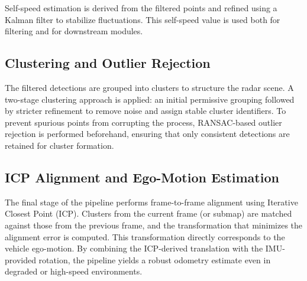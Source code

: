 Self-speed estimation is derived from the filtered points and refined using a Kalman filter to stabilize fluctuations. This self-speed value is used both for filtering and for downstream modules.

\subsection*{Clustering and Outlier Rejection}
The filtered detections are grouped into clusters to structure the radar scene. 
A two-stage clustering approach is applied: an initial permissive grouping followed by stricter refinement to remove noise and assign stable cluster identifiers.  
To prevent spurious points from corrupting the process, RANSAC-based outlier rejection is performed beforehand, ensuring that only consistent detections are retained for cluster formation.

\subsection*{ICP Alignment and Ego-Motion Estimation}
The final stage of the pipeline performs frame-to-frame alignment using Iterative Closest Point (ICP).  
Clusters from the current frame (or submap) are matched against those from the previous frame, and the transformation that minimizes the alignment error is computed.  
This transformation directly corresponds to the vehicle ego-motion.  
By combining the ICP-derived translation with the IMU-provided rotation, the pipeline yields a robust odometry estimate even in degraded or high-speed environments.

